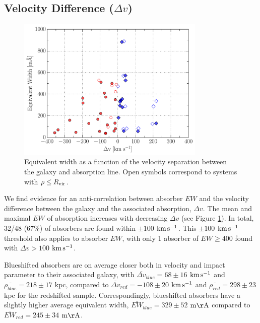 \vspace{10pt}


\subsection{Velocity Difference \rm($\Delta v$\rm)}
\label{veldiff}

\begin{figure}[ht!]
        \centering
        \includegraphics[width=0.8\textwidth]{Chap3/figures/fig10.pdf}
        \caption{\small{Equivalent width as a function of the velocity separation between the galaxy and absorption line. Open symbols correspond to systems with $\rho \leq R_{\rm vir}$.}}
        \label{W_veldif}
        \vspace{5pt}
\end{figure} 

We find evidence for an anti-correlation between absorber $EW$ and the velocity difference between the galaxy and the associated absorption, $\Delta v$. The mean and maximal $EW$ of absorption increases with decreasing $\Delta v$ (see Figure \ref{W_veldif}). In total, 32/48 ($67\%$) of absorbers are found within $\pm100$ $\rm km\, s^{-1}$. This $\pm100$ $\rm km\, s^{-1}$ threshold also applies to absorber $EW$, with only 1 absorber of $EW \geq 400$ found with $\Delta v > 100$ $\rm km\, s^{-1}$. 

Blueshifted absorbers are on average closer both in velocity and impact parameter to their associated galaxy, with $\overline{\Delta v}_{blue} = 68\pm16$ $\rm km\, s^{-1}$ and $\overline{\rho_{blue}} = 218\pm17$ kpc,  compared to $\overline{\Delta v}_{red}=-108\pm20$ $\rm km\, s^{-1}$ and $\overline{\rho_{red}} = 298\pm23$ kpc for the redshifted sample. Correspondingly, blueshifted absorbers have a slightly higher average equivalent width, $\overline{EW}_{blue}=329\pm52$ $\rm m\AA$ compared to $\overline{EW}_{red}=245\pm34$ $\rm m\AA$.

